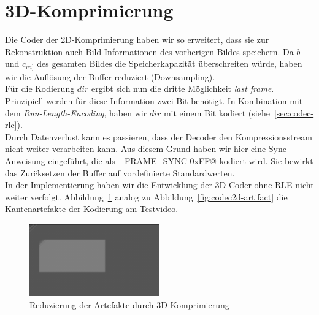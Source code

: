 \section{3D-Komprimierung}
\label{sec:codec3d}
Die Coder der 2D-Komprimierung haben wir so erweitert, dass sie zur
Rekonstruktion auch Bild-Informationen des vorherigen Bildes speichern. Da $b$
und $c_{va]}$ des gesamten Bildes die Speicherkapazit\"at \"uberschreiten
w\"urde, haben wir die Aufl\"osung der Buffer reduziert (Downsampling).
\\
F\"ur die Kodierung $dir$ ergibt sich nun die dritte M\"oglichkeit \textit{last
frame}. Prinzipiell werden f\"ur diese Information zwei Bit ben\"otigt. In
Kombination mit dem \textit{Run-Length-Encoding}, haben wir $dir$ mit einem Bit
kodiert (siehe~\ref{sec:codec-rle}).
\\
Durch Datenverlust kann es passieren, dass der Decoder den Kompressionsstream
nicht weiter verarbeiten kann. Aus diesem Grund haben wir hier eine
Sync-Anweisung eingef\"uhrt, die als \verb@CMPR_FRAME_SYNC 0xFF@ kodiert wird.
Sie bewirkt das Zur\"cksetzen der Buffer auf vordefinierte Standardwerten.
\\
In der Implementierung haben wir die Entwicklung der 3D Coder ohne RLE nicht
weiter verfolgt. Abbildung~\ref{fig:codec3d-artifact} analog zu
Abbildung~\ref{fig:codec2d-artifact} die Kantenartefakte der Kodierung am
Testvideo.
%
\begin{figure}[tbhp]
\begin{center}
\includegraphics[width=0.5\textwidth]{img/codec3d-artifact}
\end{center}
\caption{Reduzierung der Artefakte durch 3D Komprimierung}
\label{fig:codec3d-artifact}
\end{figure}
%
%
%
%
